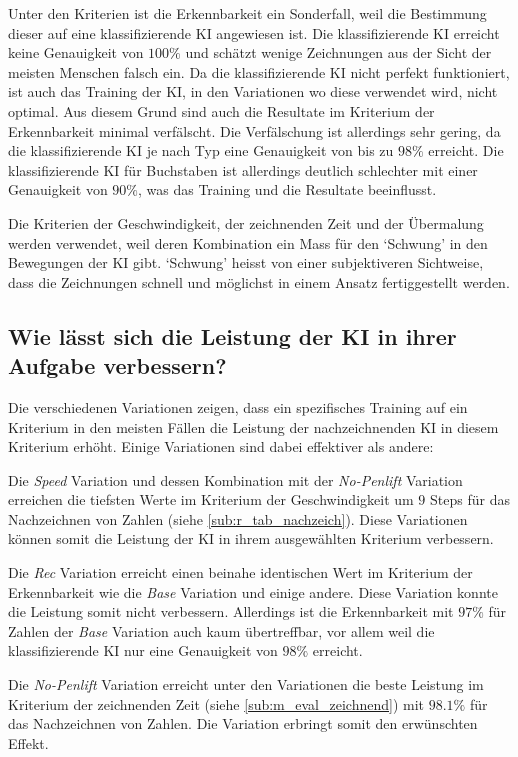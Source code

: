 Unter den Kriterien ist die Erkennbarkeit ein Sonderfall, weil die Bestimmung
dieser auf eine klassifizierende KI angewiesen ist. Die klassifizierende KI
erreicht keine Genauigkeit von $100\%$ und schätzt wenige Zeichnungen aus der
Sicht der meisten Menschen falsch ein. Da die klassifizierende KI nicht perfekt
funktioniert, ist auch das Training der KI, in den Variationen wo diese
verwendet wird, nicht optimal. Aus diesem Grund sind auch die Resultate im
Kriterium der Erkennbarkeit minimal verfälscht. Die Verfälschung ist allerdings
sehr gering, da die klassifizierende KI je nach Typ eine Genauigkeit von bis zu
$98\%$ erreicht. Die klassifizierende KI für Buchstaben ist allerdings deutlich
schlechter mit einer Genauigkeit von $90\%$, was das Training und die Resultate
beeinflusst.

Die Kriterien der Geschwindigkeit, der zeichnenden Zeit und der Übermalung
werden verwendet, weil deren Kombination ein Mass für den `Schwung' in den
Bewegungen der KI gibt. `Schwung' heisst von einer subjektiveren Sichtweise, dass
die Zeichnungen schnell und möglichst in einem Ansatz fertiggestellt werden.



\subsection{Wie lässt sich die Leistung der KI in ihrer Aufgabe verbessern?}\label{subsub:d_frage_unter_3}
Die verschiedenen Variationen zeigen, dass ein spezifisches Training auf ein
Kriterium in den meisten Fällen die Leistung der nachzeichnenden KI in diesem
Kriterium erhöht. Einige Variationen sind dabei effektiver als andere:

Die \emph{Speed} Variation und dessen Kombination mit der \emph{No-Penlift}
Variation erreichen die tiefsten Werte im Kriterium der Geschwindigkeit um $9$
Steps für das Nachzeichnen von Zahlen (siehe \ref{sub:r_tab_nachzeich}).
Diese Variationen können somit die Leistung der KI in ihrem ausgewählten
Kriterium verbessern.

Die \emph{Rec} Variation erreicht einen beinahe identischen Wert im Kriterium
der Erkennbarkeit wie die \emph{Base} Variation und einige andere. Diese
Variation konnte die Leistung somit nicht verbessern. Allerdings ist die
Erkennbarkeit mit $97\%$ für Zahlen der \emph{Base} Variation auch kaum
übertreffbar, vor allem weil die klassifizierende KI nur eine Genauigkeit von
$98\%$ erreicht.

Die \emph{No-Penlift} Variation erreicht unter den Variationen die beste
Leistung im Kriterium der zeichnenden Zeit (siehe
\ref{sub:m_eval_zeichnend}) mit $98.1\%$ für das Nachzeichnen von Zahlen.
Die Variation erbringt somit den erwünschten Effekt.

